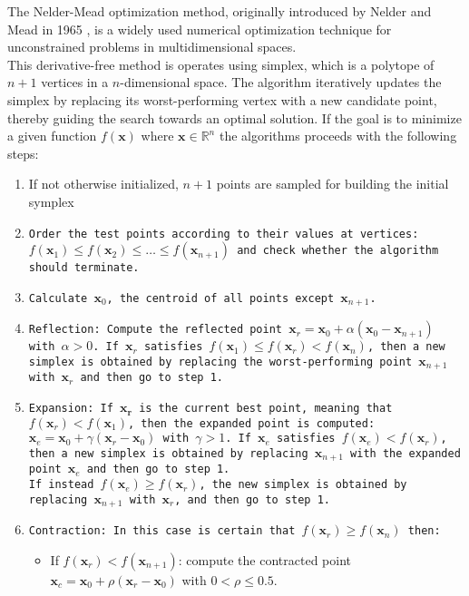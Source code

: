 The Nelder-Mead optimization method, originally introduced by Nelder and Mead in 1965 \cite{NelderMeads}, is a widely used numerical optimization technique for unconstrained problems in multidimensional spaces. \\
This derivative-free method is operates using simplex, which is a polytope of $n+1$ vertices in a $n$-dimensional space.
The algorithm iteratively updates the simplex by replacing its worst-performing vertex with a new candidate point, thereby guiding the search towards an optimal solution. 
If the goal is to minimize a given function $f(\mathbf{x})$ where $\mathbf{x} \in \mathbb{R}^n$ the algorithms proceeds with the following steps:\begin{enumerate}
    \item If not otherwise initialized, $n+1$ points are sampled for building the initial symplex
    \item \tt{Order} the test points according to their values at vertices: $f(\mathbf{x}_1) \leq f(\mathbf{x}_2) \leq \dots \leq f(\mathbf{x}_{n+1})$ and check whether the algorithm should terminate.
    \item \tt{Calculate} $\mathbf{x}_0$, the centroid of all points except $\mathbf{x}_{n+1}$.
    \item \tt{Reflection}: Compute the reflected point $\mathbf{x}_r = \mathbf{x}_0 + \alpha(\mathbf{x}_0 - \mathbf{x}_{n+1})$ with $\alpha > 0$. 
            If $\mathbf{x}_r$ satisfies $f(\mathbf{x}_1) \leq f(\mathbf{x}_r) < f(\mathbf{x}_n)$, then a new simplex is obtained by replacing the worst-performing point $\mathbf{x}_{n+1}$ with $\mathbf{x}_r$ and then go to step 1.
    \item \tt{Expansion}: If $\mathbf{x_r}$ is the current best point, meaning that $f(\mathbf{x}_r) < f(\mathbf{x}_1)$, then the expanded point is computed: $\mathbf{x}_e = \mathbf{x}_0 + \gamma(\mathbf{x}_r-\mathbf{x}_0)$ with $\gamma>1$.
           If $\mathbf{x}_e$ satisfies $f(\mathbf{x}_e) < f(\mathbf{x}_r)$, then a new simplex is obtained by replacing $\mathbf{x}_{n+1}$ with the expanded point $\mathbf{x}_e$ and then go to step 1.\\
            If instead $f(\mathbf{x}_e) \geq f(\mathbf{x}_r)$, the new simplex is obtained by replacing $\mathbf{x}_{n+1}$ with $\mathbf{x}_r$, and then go to step 1.
    \item \tt{Contraction}: In this case is certain that $f(\mathbf{x}_r) \geq f(\mathbf{x}_n)$ then:\begin{itemize}
        \item If $f(\mathbf{x}_r) < f(\mathbf{x}_{n+1})$: compute the contracted point $\mathbf{x}_c=\mathbf{x}_0 +\rho(\mathbf{x}_{r}-\mathbf{x}_0)$ with $0<\rho \leq 0.5$.

\end{itemize}
\end{enumerate}
